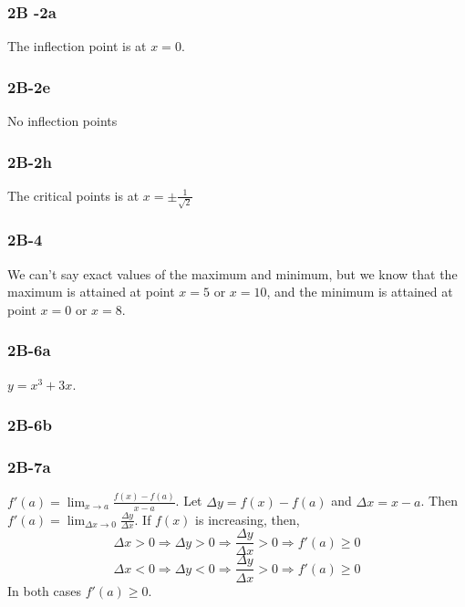 \documentclass{article}
\begin{document}
\begin{figure}[htp!]
    \centering
    
    \label{fig:fig3}
\end{figure}
\subsubsection{2B -2a} The inflection point is at $x = 0$.
\subsubsection{2B-2e} No inflection points
\subsubsection{2B-2h} The critical points is at $x = \pm \frac{1}{\sqrt{2}}$

\newpage
\subsubsection{2B-4}
\begin{figure}[htp!]
    \centering
    
    \label{fig:fig4}
\end{figure}
We can't say exact values of the maximum and minimum, but we know that the maximum is attained at point $x = 5$ or $x = 10$, and the minimum is attained at point $x = 0$ or $x = 8$.

\subsubsection{2B-6a} $y = x^3 + 3x$.

\newpage
\subsubsection{2B-6b}
\begin{figure}[htp!]
    \centering
    
    \label{fig:fig5}
\end{figure}


\subsubsection{2B-7a}
$f'(a) = \lim_{x \to a} \frac{f(x)-f(a)}{x-a}$. Let $\Delta y = f(x) - f(a)$ and $\Delta x = x - a$. Then $f'(a) = \lim_{\Delta x \to 0} \frac{\Delta y}{\Delta x}$. If $f(x)$ is increasing, then,
\[ \Delta x > 0 \Rightarrow \Delta y > 0 \Rightarrow 
 \frac{\Delta y}{\Delta x} > 0 \Rightarrow f'(a) \geq 0 \]
\[ \Delta x < 0 \Rightarrow \Delta y < 0 \Rightarrow 
 \frac{\Delta y}{\Delta x} > 0 \Rightarrow f'(a) \geq 0 \]
In both cases $f'(a) \geq 0$.
\end{document}
